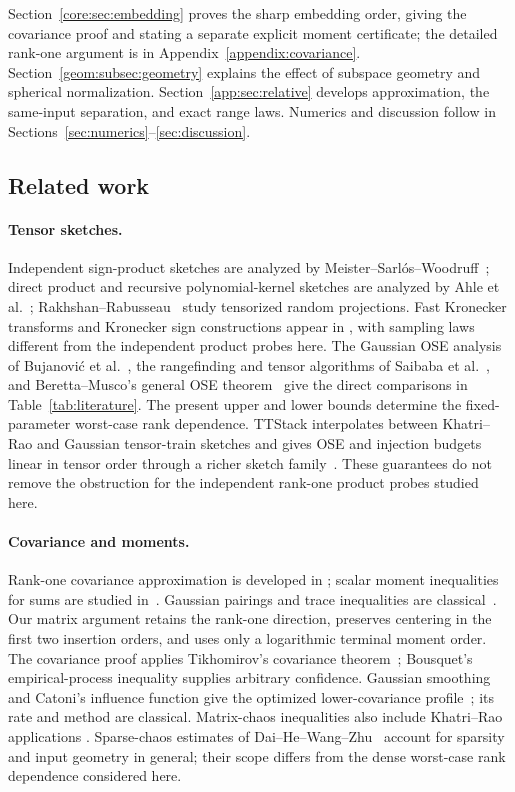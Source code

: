 \documentclass[11pt,a4paper]{article}
\theoremstyle{definition}\newtheorem{definition}[theorem]{Definition}
\theoremstyle{remark}\newtheorem{remark}[theorem]{Remark}
\numberwithin{equation}{section}
\begin{document}
Section~\ref{core:sec:embedding} proves the sharp embedding order,
giving the covariance proof and stating a separate explicit
moment certificate; the detailed rank-one argument is in
Appendix~\ref{appendix:covariance}. Section~\ref{geom:subsec:geometry} explains the effect of
subspace geometry and spherical normalization. Section~\ref{app:sec:relative}
develops approximation, the same-input separation, and exact range laws.
Numerics and discussion follow in Sections~\ref{sec:numerics}--\ref{sec:discussion}.

\subsection{Related work}
\paragraph{Tensor sketches.}
Independent sign-product sketches are analyzed by
Meister--Sarl\'os--Woodruff~\cite{MSW2019}; direct product and recursive
polynomial-kernel sketches are analyzed by Ahle et al.~\cite{Ahle2020}; Rakhshan--Rabusseau~\cite{RakhshanRabusseau2020}
study tensorized random projections. Fast Kronecker transforms and
Kronecker sign constructions appear in
\cite{JinKoldaWard2021,BambergerKrahmerWard2022}, with sampling laws
different from the independent product probes here.
The Gaussian OSE analysis of Bujanovi\'c et al.~\cite{BGKL2026}, the
rangefinding and tensor algorithms of Saibaba et al.~\cite{SVB2026},
and Beretta--Musco's general OSE theorem~\cite{BM2026} give the direct
comparisons in Table~\ref{tab:literature}. The present upper and lower
bounds determine the fixed-parameter worst-case rank dependence.
TTStack interpolates between Khatri--Rao and Gaussian tensor-train
sketches and gives OSE and injection budgets linear in tensor order
through a richer sketch family~\cite{TTStack2026}. These guarantees
do not remove the obstruction for the independent rank-one product
probes studied here.

\paragraph{Covariance and moments.}
Rank-one covariance approximation is developed in
\cite{Rudelson1999,Oliveira2010}; scalar moment inequalities for sums are
studied in~\cite{Latala1997}. Gaussian pairings and trace inequalities
are classical~\cite{Isserlis,Janson,TroppElementary}.
Our matrix argument retains the rank-one direction, preserves centering
in the first two insertion orders, and uses only a logarithmic terminal
moment order. The covariance proof applies Tikhomirov's covariance
theorem~\cite{Tikhomirov2018}; Bousquet's empirical-process inequality
\cite{Bousquet2002} supplies arbitrary confidence. Gaussian smoothing
and Catoni's influence function give the optimized lower-covariance
profile~\cite{Oliveira2016,Catoni2012}; its rate and method are classical.
Matrix-chaos inequalities also include Khatri--Rao applications
\cite{MatrixChaos2025}. Sparse-chaos estimates of
Dai--He--Wang--Zhu~\cite{DHWZ2026} account for sparsity and input
geometry in general; their scope differs from the dense worst-case
rank dependence considered here.
\end{document}
